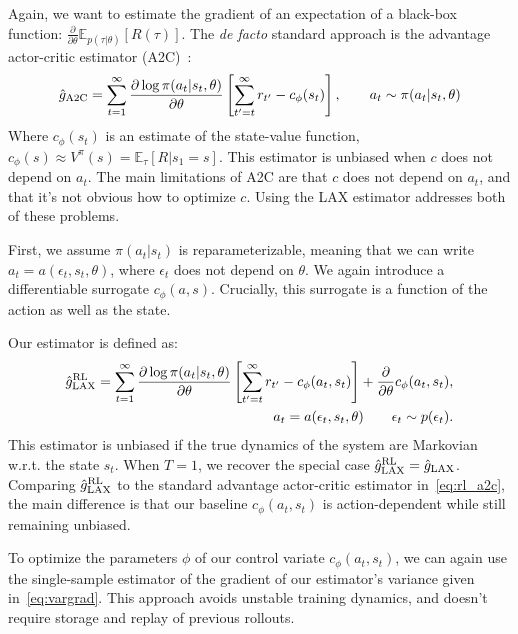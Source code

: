 \documentclass{article}
\newcommand{\E}{\mathbb{E}}
\newcommand{\LL}[1]{\frac{\partial \log \pi(a_{#1}| s_{#1}, \theta)}{\partial \theta}}
\newcommand{\PT}{\frac{\partial}{\partial \theta}}
\newcommand{\LAX}{{\textnormal{LAX}}}
\newcommand{\RL}{{\textnormal{RL}}}
\begin{document}
Again, we want to estimate the gradient of an expectation of a black-box function: $ \PT \E_{p(\tau|\theta)}[R(\tau)]$.
The \emph{de facto} standard approach is the advantage actor-critic estimator (A2C)~\citep{sutton2000policy}:
%
%
%
\begin{align}
\hat g_{\textnormal{A2C}} = \sum_{t=1}^{\infty} \LL{t} \left[ \sum_{t'=t}^{\infty} r_{t'} - c_\phi(s_t) \right], \qquad a_t \sim \pi(a_t | s_t, \theta)
\label{eq:rl_a2c}
\end{align}
%
Where $c_\phi(s_t)$ is an estimate of the state-value function, $c_\phi(s) \approx V^\pi(s) = \E_{\tau}[R|s_1=s].$
This estimator is unbiased when $c$ does not depend on $a_t$.
The main limitations of A2C are that $c$ does not depend on $a_t$, and that it's not obvious how to optimize $c$.
Using the \LAX{} estimator addresses both of these problems.

First, we assume $\pi(a_t|s_t)$ is reparameterizable, meaning that we can write $a_t = a(\epsilon_t, s_t, \theta)$, where $\epsilon_t$ does not depend on $\theta$.
We again introduce a differentiable surrogate $c_\phi(a,s)$.
Crucially, this surrogate is a function of the action as well as the state.

Our estimator is defined as: 
%
\begin{align}
\hat g_\LAX^{\RL} = \sum_{t=1}^{\infty} \LL{t} \left[ \sum_{t'=t}^{\infty} r_{t'} - c_\phi(a_t,s_t) \right] +\frac{\partial}{\partial\theta} c_\phi(a_t, s_t), \\
a_t = a(\epsilon_t,s_t, \theta) \qquad \epsilon_t \sim p(\epsilon_t)\nonumber.
\label{eq:rl_est}
\end{align}
%
This estimator is unbiased if the true dynamics of the system are Markovian w.r.t. the state $s_t$.
When $T = 1$, we recover the special case ${\hat g_\LAX^{\RL} = \hat g_\LAX}$.
Comparing $\hat g_\LAX^{\RL}$ to the standard advantage actor-critic estimator in~\eqref{eq:rl_a2c}, the main difference is that our baseline $c_\phi(a_t, s_t)$ is action-dependent while still remaining unbiased.

To optimize the parameters $\phi$ of our control variate $c_\phi(a_t, s_t)$, we can again use the single-sample estimator of the gradient of our estimator's variance given in~\eqref{eq:vargrad}.
This approach avoids unstable training dynamics, and doesn't require storage and replay of previous rollouts.
\end{document}
